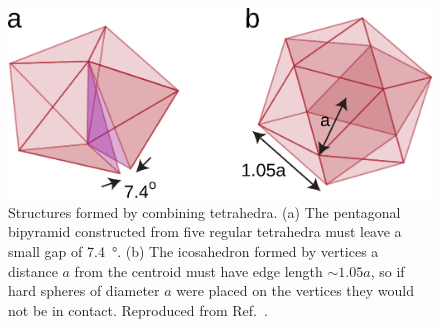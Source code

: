 \documentclass[11pt,twoside]{report}
\begin{document}


\begin{figure}
  \includegraphics[width=0.7\linewidth,outer]{frustration}
  \caption[Frustration of tetrahedral structures]{
    Structures formed by combining tetrahedra.
    (a) The pentagonal bipyramid constructed from five regular tetrahedra must leave a small gap of \SI{7.4}{\degree}.
    (b) The icosahedron formed by vertices a distance $a$ from the centroid must have edge length $\sim1.05 a$, so if hard spheres of diameter $a$ were placed on the vertices they would not be in contact.
    Reproduced from Ref.\ \cite{RoyallPR2015}.
  }
  \label{fig:frustration}
\end{figure}
\end{document}
